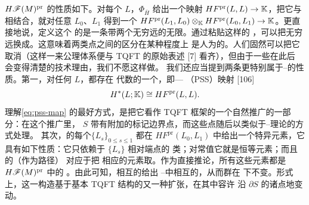 $H\mathscr{F}(M)^{\mathrm{pr}}$ 的\trFrobenius{}性质如下。对每个 $L$，\trInvariant{}$\Phi_{\overline{H}}$
给出一个\trLinear{}映射 $HF^{\mathrm{pr}}(L,L)\to\mathbb{K}$，把它与\trComposition{}相结合，就对任意
$L_0$、$L_1$ 得到一个\trNondegenerate\trPairing
$HF^{\mathrm{pr}}(L_1,L_0)\otimes_{\mathbb{K}} HF^{\mathrm{pr}}(L_0,L_1)\to\mathbb{K}$。更直接地说，定义这个%
\trPairing{}的\trSurface{}是一条带两个无穷远\trOutgoingPoint{}的无限\trStrip。通过粘贴这样的%
\trStrip，可以把无穷远\trIncomingPoint{}换成\trOutgoingPoint。这意味着两类点之间的区分在某种程度上
是人为的。人们固然可以把它取消（这样一来公理体系便与 TQFT 的原始表述 [7] 看齐），但由于一些在此后
会变得清楚的技术理由，我们不愿这样做。
我们还应当提到两条更特别属于\trDonaldson--\trFukayaCategory{}的性质。第一，对任何 $L$，都存在%
\trFrobenius{}代数的一个\trCanonical\trIsomorphism，即\trPiunikhin--\trSalamon--\trSchwarz
（PSS）映射 [106]
\begin{equation}\label{eq:pss-map}
H^*(L;\mathbb{K})\cong HF^{\mathrm{pr}}(L,L).
\end{equation}
理解\eqref{eq:pss-map} 的最好方式，是把它看作 TQFT 框架的一个自然推广的一部分：在这个推广里，
\trSurface{}$S$ 带有附加的标记边界点，而这些点随后以类似于\trGromov--\trWitten{}理论的方式处理。
其次，\trExact\trLagrange\trSubmanifold{}的每个\trIsotopy{}$\{L_s\}_{0\le s\le 1}$ 都在
$HF^{\mathrm{pr}}(L_0,L_1)$ 中给出一个特异元素，它具有如下性质：它只依赖于 $\{L_s\}$ 相对端点的%
\trHomotopy{}类；对常值\trIsotopy{}它就是恒等元素；而且\trIsotopy{}的\trComposition{}（作为路径）
对应于把
相应的元素取\trTriangleProduct。作为直接推论，所有这些元素都是 $H\mathscr{F}(M)^{\mathrm{pr}}$ 中的%
\trIsomorphism。由此可知，相互\trIsotopy{}的\trLagrange\trSubmanifold{}给出%
\trDonaldson--\trFukayaCategory{}中相互\trIsomorphic{}的\trObject，从而\trFloerCohomology{}群在%
\trIsotopy{}下不变。形式上，这一构造基于基本 TQFT 结构的又一种扩张，在其中容许%
\trLagrange\trBoundaryCondition{}沿 $\partial S$ 的诸点\trSmooth{}地变动。
